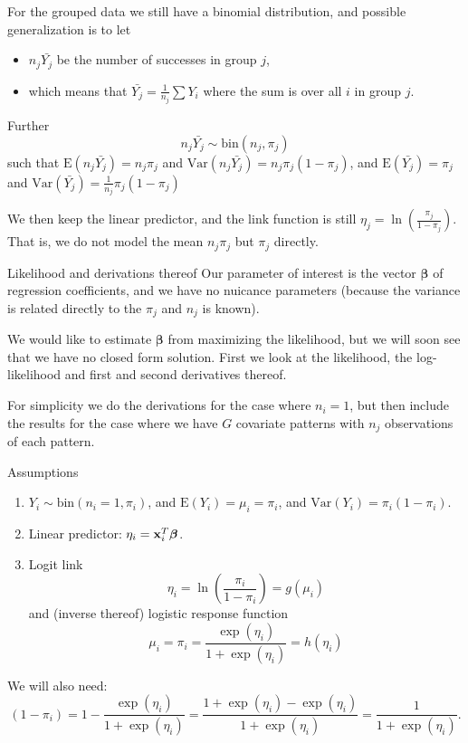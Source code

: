\documentclass[
  ignorenonframetext,
]{beamer}
\providecommand{\tightlist}{%
  \setlength{\itemsep}{0pt}\setlength{\parskip}{0pt}}
\begin{document}
\begin{frame}
For the grouped data we still have a binomial distribution, and possible
generalization is to let

\begin{itemize}
\tightlist
\item
  \(n_j\bar{Y_j}\) be the number of successes in group \(j\),
\item
  which means that \(\bar{Y_j}=\frac{1}{n_j}\sum Y_i\) where the sum is
  over all \(i\) in group \(j\).
\end{itemize}

Further \[ n_j\bar{Y_j} \sim \text{bin}(n_j,\pi_j)\] such that
\(\text{E}(n_j\bar{Y_j})=n_j \pi_j\) and
\(\text{Var}(n_j\bar{Y_j})=n_j \pi_j(1-\pi_j)\), and
\(\text{E}(\bar{Y_j})=\pi_j\) and
\(\text{Var}(\bar{Y_j})=\frac{1}{n_j} \pi_j(1-\pi_j)\)

We then keep the linear predictor, and the link function is still
\(\eta_j=\ln(\frac{\pi_j}{1-\pi_j})\). That is, we do not model the mean
\(n_j \pi_j\) but \(\pi_j\) directly.
\end{frame}

\begin{frame}{Likelihood and derivations thereof}
\label{likelihood-and-derivations-thereof}
Our parameter of interest is the vector \(\boldsymbol{\beta}\) of
regression coefficients, and we have no nuicance parameters (because the
variance is related directly to the \(\pi_j\) and \(n_j\) is known).

We would like to estimate \(\boldsymbol{\beta}\) from maximizing the
likelihood, but we will soon see that we have no closed form solution.
First we look at the likelihood, the log-likelihood and first and second
derivatives thereof.

For simplicity we do the derivations for the case where \(n_i=1\), but
then include the results for the case where we have \(G\) covariate
patterns with \(n_j\) observations of each pattern.
\end{frame}

\begin{frame}
\begin{block}{Assumptions}
\label{assumptions}
\begin{enumerate}
\tightlist
\item
  \(Y_i \sim \text{bin}(n_i=1,\pi_i)\), and
  \(\text{E}(Y_i)=\mu_i=\pi_i\), and \(\text{Var}(Y_i)=\pi_i(1-\pi_i)\).
\item
  Linear predictor: \(\eta_i={\bf x}_i^T \boldsymbol{\beta}\).
\item
  Logit link \[\eta_i=\ln(\frac{\pi_i}{1-\pi_i})=g(\mu_i)\] and (inverse
  thereof) logistic response function
  \[\mu_i=\pi_i=\frac{\exp(\eta_i)}{1+\exp(\eta_i)}=h(\eta_i)\]
\end{enumerate}

We will also need:
\[(1-\pi_i)=1-\frac{\exp(\eta_i)}{1+\exp(\eta_i)}=\frac{1+\exp(\eta_i)-\exp(\eta_i)}{1+\exp(\eta_i)}=\frac{1}{1+\exp(\eta_i)}.\]
\end{block}
\end{frame}
\end{document}
